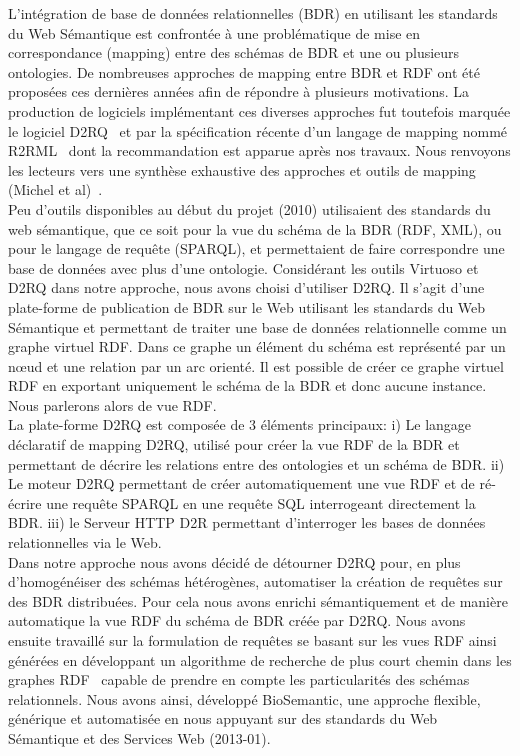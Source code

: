 L'intégration de base de données relationnelles (BDR) en utilisant les standards du Web Sémantique est confrontée à une problématique de mise en correspondance (mapping) entre des schémas de BDR et une ou plusieurs ontologies. De nombreuses approches de mapping entre BDR et RDF ont été proposées ces dernières années afin de répondre à plusieurs motivations. La production de logiciels implémentant ces diverses approches fut toutefois marquée le logiciel D2RQ~\cite{Bizer2003,Bizer2004} et par la spécification récente d’un langage de mapping nommé R2RML~\cite{Souripriya} dont la recommandation est apparue après nos travaux. Nous renvoyons les lecteurs vers une synthèse exhaustive des approches et outils de mapping (Michel et al)~\cite{Antipolis2014}.\\

Peu d’outils disponibles au début du projet (2010) utilisaient des standards du web sémantique, que ce soit pour la vue du schéma de la BDR (RDF, XML), ou pour le langage de requête (SPARQL), et permettaient de faire correspondre une base de données avec plus d’une ontologie. Considérant les outils Virtuoso et D2RQ dans notre approche, nous avons choisi d'utiliser D2RQ. Il s'agit d'une plate-forme de publication de BDR sur le Web utilisant les standards du Web Sémantique et permettant de traiter une base de données relationnelle comme un graphe virtuel RDF. Dans ce graphe un élément du schéma est représenté par un nœud et une relation par un arc orienté. Il est possible de créer ce graphe virtuel RDF en exportant uniquement le schéma de la BDR et donc aucune instance. Nous parlerons alors de vue RDF. \\

La plate-forme D2RQ est composée de 3 éléments principaux: i) Le langage déclaratif de mapping D2RQ, utilisé pour créer la vue RDF de la BDR et permettant de décrire les relations entre des ontologies et un schéma de BDR. ii) Le moteur D2RQ permettant de créer automatiquement une vue RDF et de ré-écrire une requête SPARQL en une requête SQL interrogeant directement la BDR. iii) le Serveur HTTP D2R permettant d’interroger les bases de données relationnelles via le Web.\\

Dans notre approche nous avons décidé de détourner D2RQ pour, en plus d'homogénéiser des schémas hétérogènes, automatiser la création de requêtes sur des BDR distribuées. Pour cela nous avons enrichi sémantiquement et de manière automatique la vue RDF du schéma de BDR créée par D2RQ. Nous avons ensuite travaillé sur la formulation de requêtes se basant sur les vues RDF ainsi générées en développant un algorithme de recherche de plus court chemin dans les graphes RDF~\cite{wollbrett2013clever} capable de prendre en compte les particularités des schémas relationnels. Nous avons ainsi, développé BioSemantic, une approche flexible, générique et automatisée en nous appuyant sur des standards du Web Sémantique et des Services Web (2013-01). \\

